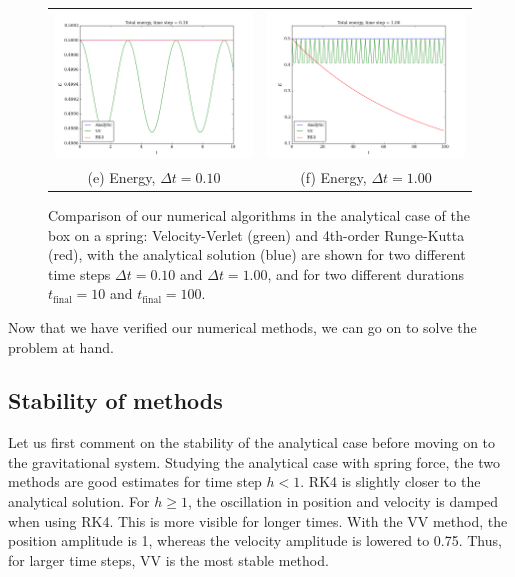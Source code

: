 \documentclass{article}
\begin{document}
\begin{multicols}{2}
\begin{figure}
\begin{center}
\begin{tabular}{cc}
  	\includegraphics[width=90mm]{Images/comparison_E_01.png}
	& \includegraphics[width=90mm]{Images/comparison_E_1.png} \\
	(e) Energy, $\Delta t = 0.10$				& (f) Energy, $\Delta t = 1.00$  \\[6pt]
\end{tabular}
\caption{Comparison of our numerical algorithms in the analytical case of the box on a spring: Velocity-Verlet (green) and 4th-order Runge-Kutta (red), with the analytical solution (blue) are shown for two different time steps $\Delta t = 0.10$ and $\Delta t = 1.00$, and for two different durations $t_{\mathrm{final}} = 10$ and $t_{\mathrm{final}} = 100$.}\label{fig:analytical}
\end{center}
\end{figure}


\noindent Now that we have verified our numerical methods, we can go on to solve the problem at hand.



\subsection{Stability of methods}

Let us first comment on the stability of the analytical case before moving on to the gravitational system. Studying the analytical case with spring force, the two methods are good estimates for time step $h<1$. RK4 is slightly closer to the analytical solution. For $h \geqslant 1$, the oscillation in position and velocity is damped when using RK4. This is more visible for longer times. With the VV method, the position amplitude is 1, whereas the velocity amplitude is lowered to 0.75. Thus, for larger time steps, VV is the most stable method.


\end{multicols}
\end{document}
